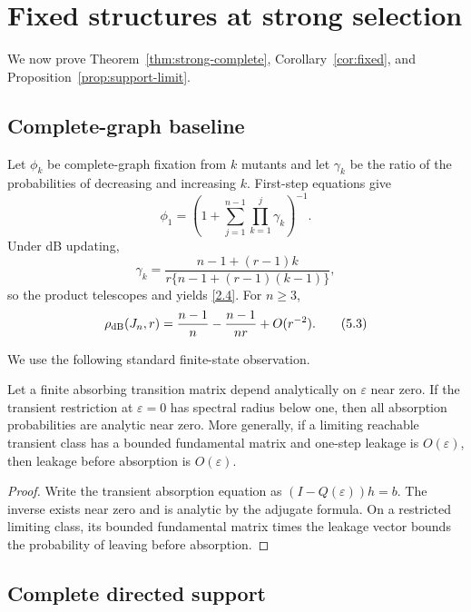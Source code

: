 \section{Fixed structures at strong selection}\label{sec:strong}

We now prove Theorem~\ref{thm:strong-complete},
Corollary~\ref{cor:fixed}, and Proposition~\ref{prop:support-limit}.

\subsection{Complete-graph baseline}

Let $\phi_k$ be complete-graph fixation from $k$ mutants and let
$\gamma_k$ be the ratio of the probabilities of decreasing and increasing
$k$.  First-step equations give
\[
 \phi_1=\left(1+\sum_{j=1}^{n-1}\prod_{k=1}^j\gamma_k\right)^{-1}.
                                                                    \tag{5.1}\label{5.1}
\]
Under dB updating,
\[
 \gamma_k=\frac{n-1+(r-1)k}{r\{n-1+(r-1)(k-1)\}},                 \tag{5.2}\label{5.2}
\]
so the product telescopes and yields \eqref{2.4}.  For $n\ge3$,
\[
 \rho_{\mathrm{dB}}(J_n,r)=\frac{n-1}{n}-\frac{n-1}{nr}+O(r^{-2}).       \tag{5.3}\label{5.3}
\]

We use the following standard finite-state observation.

\begin{lemma}\label{lem:finite-perturb}
Let a finite absorbing transition matrix depend analytically on
$\varepsilon$ near zero.  If the transient restriction at $\varepsilon=0$
has spectral radius below one, then all absorption probabilities are analytic
near zero.  More generally, if a limiting reachable transient class has a
bounded fundamental matrix and one-step leakage is $O(\varepsilon)$, then
leakage before absorption is $O(\varepsilon)$.
\end{lemma}

\begin{proof}
Write the transient absorption equation as $(I-Q(\varepsilon))h=b$.  The
inverse exists near zero and is analytic by the adjugate formula.  On a
restricted limiting class, its bounded fundamental matrix times the leakage
vector bounds the probability of leaving before absorption.
\end{proof}

\subsection{Complete directed support}

